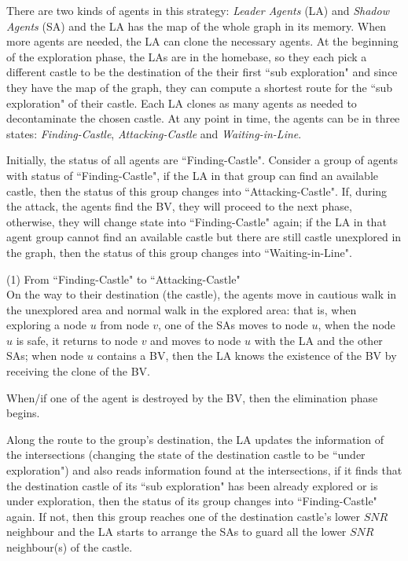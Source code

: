 There are two kinds of agents in this strategy: {\em Leader Agents} (LA) and {\em Shadow Agents} (SA) and the LA has the map of the whole graph in its memory. When more agents are needed, the LA can clone the necessary agents. At the beginning of the exploration phase, the LAs are in the homebase, so they each pick a different castle to be the destination of the their first ``sub exploration" and since they have the map of the graph, they can compute a shortest route for the ``sub exploration"  of their  castle. 
Each LA clones as many agents as needed to decontaminate the chosen castle. 
At any point in time, the  agents  can be in three states: 
{\em Finding-Castle}, {\em Attacking-Castle} and {\em Waiting-in-Line}. 

Initially, the status of all agents   are ``Finding-Castle". 
Consider a group of agents  with   status of ``Finding-Castle", if the LA in that   group can find an available castle, then the status of this group changes into ``Attacking-Castle". 
 If, during the attack, the agents find the BV, they will proceed to the next phase, otherwise, they will change state into   ``Finding-Castle" again; if the LA in that agent group cannot find an available castle but there are still castle unexplored in the graph, then the status of this group changes into ``Waiting-in-Line". 


(1) From ``Finding-Castle" to ``Attacking-Castle"\\
On the way to their destination (the castle), the agents move in cautious walk  in the unexplored area and 
normal walk in the explored area: that is, when exploring a node $u$ from   node $v$, one of the SAs moves to node $u$, when the node $u$ is safe, it returns to node $v$ and moves to   node $u$ with the LA and the other SAs; when   node $u$ contains a BV, then the LA knows the existence of the BV by receiving the clone of the BV.   

When/if one of the agent is destroyed by the BV, then the elimination phase begins.

Along the route to the group's destination, the LA updates the information of the intersections  (changing the state of the destination castle to be ``under exploration")  and also reads information  found at the intersections, if it finds that the destination castle of its ``sub exploration" has been already explored or is under exploration, then the status of its group changes into ``Finding-Castle" again. If not, then this group reaches one of the destination castle's lower $SNR$ neighbour and the LA starts to arrange the SAs to guard all the lower $SNR$ neighbour(s) of the castle. 

